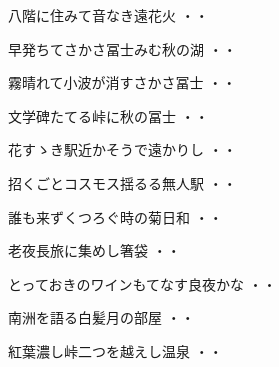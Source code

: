 \vspace{0.6cm}
\begin{shiika}八階に住みて音なき遠花火
\hfill{・・}\end{shiika}
\vspace{0.6cm}
\begin{shiika}早発ちてさかさ冨士みむ秋の湖
\hfill{・・}\end{shiika}
\vspace{0.6cm}
\begin{shiika}霧晴れて小波が消すさかさ冨士
\hfill{・・}\end{shiika}
\vspace{0.6cm}
\begin{shiika}文学碑たてる峠に秋の冨士
\hfill{・・}\end{shiika}
\vspace{0.6cm}
\begin{shiika}花すゝき駅近かそうで遠かりし
\hfill{・・}\end{shiika}
\vspace{0.6cm}
\begin{shiika}招くごとコスモス揺るる無人駅
\hfill{・・}\end{shiika}
\vspace{0.6cm}
\begin{shiika}誰も来ずくつろぐ時の菊日和
\hfill{・・}\end{shiika}
\vspace{0.6cm}
\begin{shiika}老夜長旅に集めし箸袋
\hfill{・・}\end{shiika}
\vspace{0.6cm}
\begin{shiika}とっておきのワインもてなす良夜かな
\hfill{・・}\end{shiika}
\vspace{0.6cm}
\begin{shiika}南洲を語る白髪月の部屋
\hfill{・・}\end{shiika}
\vspace{0.6cm}
\begin{shiika}紅葉濃し峠二つを越えし温泉
\hfill{・・}\end{shiika}
